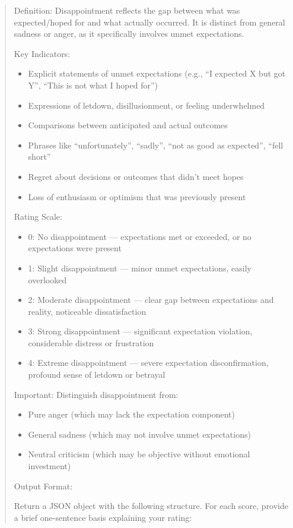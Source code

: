 \begin{quote}
Definition: Disappointment reflects the gap between what was expected/hoped for
and what actually occurred. It is distinct from general sadness or anger,
as it specifically involves unmet expectations.

Key Indicators:
\begin{itemize}
  \item Explicit statements of unmet expectations
        (e.g., ``I expected X but got Y'', ``This is not what I hoped for'')
  \item Expressions of letdown, disillusionment, or feeling underwhelmed
  \item Comparisons between anticipated and actual outcomes
  \item Phrases like ``unfortunately'', ``sadly'', ``not as good as expected'', ``fell short''
  \item Regret about decisions or outcomes that didn't meet hopes
  \item Loss of enthusiasm or optimism that was previously present
\end{itemize}

Rating Scale:
\begin{itemize}
  \item 0: No disappointment --- expectations met or exceeded, or no expectations were present
  \item 1: Slight disappointment --- minor unmet expectations, easily overlooked
  \item 2: Moderate disappointment --- clear gap between expectations and reality, noticeable dissatisfaction
  \item 3: Strong disappointment --- significant expectation violation, considerable distress or frustration
  \item 4: Extreme disappointment --- severe expectation disconfirmation, profound sense of letdown or betrayal
\end{itemize}

Important: Distinguish disappointment from:
\begin{itemize}
  \item Pure anger (which may lack the expectation component)
  \item General sadness (which may not involve unmet expectations)
  \item Neutral criticism (which may be objective without emotional investment)
\end{itemize}

\medskip
Output Format:

Return a JSON object with the following structure. For each score, provide a brief
one-sentence basis explaining your rating:


\end{quote}
